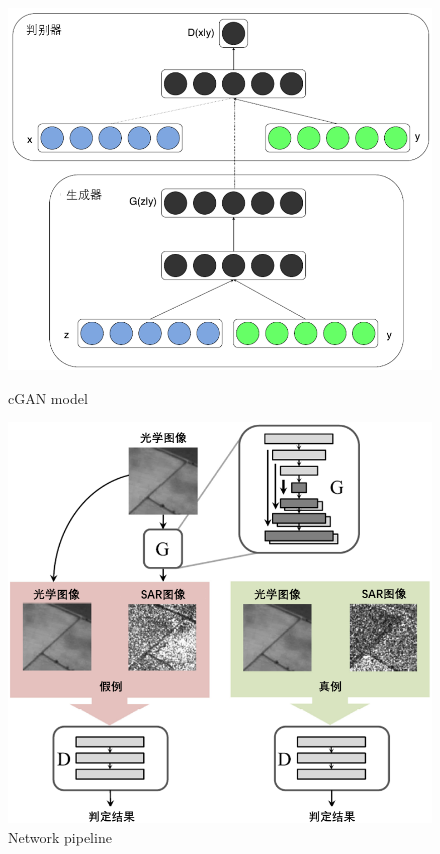 \documentclass[]{IEEEtran}
\begin{document}
\begin{figure}
	\vspace{0.5cm}
		\centering
		\includegraphics[width=0.7\columnwidth]{fw}
		\caption{cGAN model}
		\label{fig:fw}
	\vspace{0.3cm}
		\centering
		\includegraphics[width=0.7\columnwidth]{rt}
		\caption{Network pipeline}
		\label{fig:rt}
\end{figure}





\end{document}
